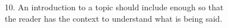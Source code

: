 \documentclass[12pt]{article}
\begin{document}
10. An introduction to a topic should include enough \underline{\hspace{4cm}} so that \\the reader has the context to understand what is being said.  
\vspace{2cm}



\end{document}
